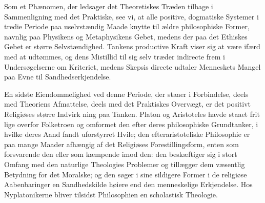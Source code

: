 \documentclass[12pt,a4paper]{book}
\begin{document}
Som et Phænomen, der ledsager det Theoretiskes Træden
tilbage i Sammenligning med det Praktiske, see vi, at alle
positive, dogmatiske Systemer i tredie Periode paa uselvstændig
Maade knytte til ældre philosophiske Former, navnlig paa
Physikens og Metaphysikens Gebet, medens der paa det Ethiskes
Gebet er større Selvstændighed. Tankens productive Kraft viser
sig at være ifærd med at udtømmes, og dens Mistillid til sig
selv træder indirecte frem i Undersøgelserne om Kriteriet,
medens Skepsis directe udtaler Menneskets Mangel paa Evne
til Sandhedserkjendelse.

En sidste Eiendommelighed ved denne Periode, der staaer
i Forbindelse, deels med Theoriens Afmattelse, deels med det
Praktiskes Overvægt, er det positivt Religiøses større Indvirk\-%
ning paa Tanken. Platon og Aristoteles havde staaet frit lige\-%
overfor Folketroen og omformet den efter deres philosophiske
Grundtanker, i hvilke deres Aand fandt uforstyrret Hvile; den
efteraristoteliske Philosophie er paa mange Maader afhængig
af det Religiøses Forestillingsform, enten som forsvarende den
eller som kæmpende imod den: den beskæftiger sig i stort
Omfang med den naturlige Theologies Problemer og tillægger
dem væsentlig Betydning for det Moralske; og den søger
i sine sildigere Former i de religiøse Aabenbaringer en
Sandhedskilde høiere end den menneskelige Erkjendelse. Hos
Nyplatonikerne bliver tilsidst Philosophien en scholastisk
Theologie.
\end{document}
